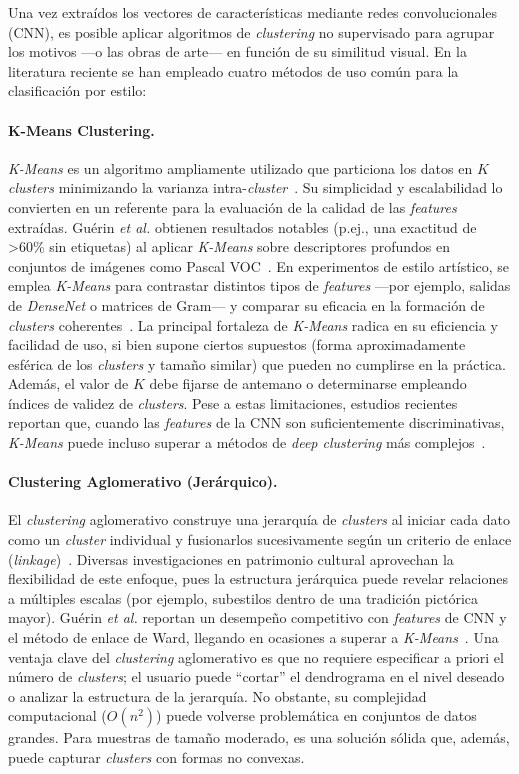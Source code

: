 Una vez extraídos los vectores de características mediante redes convolucionales (CNN), es posible aplicar algoritmos de \textit{clustering} no supervisado para agrupar los motivos —o las obras de arte— en función de su similitud visual. En la literatura reciente se han empleado cuatro métodos de uso común para la clasificación por estilo: \paragraph{K-Means Clustering.} \textit{K-Means} es un algoritmo ampliamente utilizado que particiona los datos en $K$ \textit{clusters} minimizando la varianza intra-\textit{cluster}~\cite{guerin2018,dangeti2024}. Su simplicidad y escalabilidad lo convierten en un referente para la evaluación de la calidad de las \textit{features} extraídas. Guérin \textit{et al.} obtienen resultados notables (p.ej., una exactitud de \textgreater 60\% sin etiquetas) al aplicar \textit{K-Means} sobre descriptores profundos en conjuntos de imágenes como Pascal VOC~\cite{guerin2018}. En experimentos de estilo artístico, se emplea \textit{K-Means} para contrastar distintos tipos de \textit{features} —por ejemplo, salidas de \textit{DenseNet} o matrices de Gram— y comparar su eficacia en la formación de \textit{clusters} coherentes~\cite{dangeti2024}. La principal fortaleza de \textit{K-Means} radica en su eficiencia y facilidad de uso, si bien supone ciertos supuestos (forma aproximadamente esférica de los \textit{clusters} y tamaño similar) que pueden no cumplirse en la práctica. Además, el valor de $K$ debe fijarse de antemano o determinarse empleando índices de validez de \textit{clusters}. Pese a estas limitaciones, estudios recientes reportan que, cuando las \textit{features} de la CNN son suficientemente discriminativas, \textit{K-Means} puede incluso superar a métodos de \textit{deep clustering} más complejos~\cite{dangeti2024}. \paragraph{Clustering Aglomerativo (Jerárquico).} El \textit{clustering} aglomerativo construye una jerarquía de \textit{clusters} al iniciar cada dato como un \textit{cluster} individual y fusionarlos sucesivamente según un criterio de enlace (\textit{linkage})~\cite{guerin2018,parisotto2022}. Diversas investigaciones en patrimonio cultural aprovechan la flexibilidad de este enfoque, pues la estructura jerárquica puede revelar relaciones a múltiples escalas (por ejemplo, subestilos dentro de una tradición pictórica mayor). Guérin \textit{et al.} reportan un desempeño competitivo con \textit{features} de CNN y el método de enlace de Ward, llegando en ocasiones a superar a \textit{K-Means}~\cite{guerin2018}. Una ventaja clave del \textit{clustering} aglomerativo es que no requiere especificar a priori el número de \textit{clusters}; el usuario puede “cortar” el dendrograma en el nivel deseado o analizar la estructura de la jerarquía. No obstante, su complejidad computacional ($O(n^2)$) puede volverse problemática en conjuntos de datos grandes. Para muestras de tamaño moderado, es una solución sólida que, además, puede capturar \textit{clusters} con formas no convexas. 